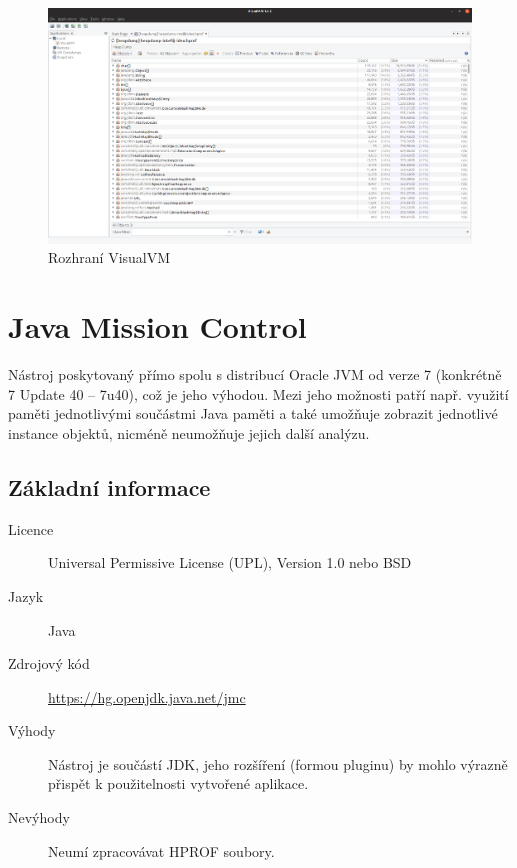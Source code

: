 \begin{figure}[ht!]
	\centering
	\includegraphics[scale=0.3]{obrazky/visualvm.png}
	\caption{Rozhraní VisualVM}
	\label{obr-visualvm}
\end{figure}

\section{Java Mission Control}
Nástroj poskytovaný přímo spolu s distribucí Oracle JVM od verze 7 (konkrétně 7 Update 40 – 7u40), což je jeho výhodou. Mezi jeho možnosti patří např. využití paměti jednotlivými součástmi Java paměti a také umožňuje zobrazit jednotlivé instance objektů, nicméně neumožňuje jejich další analýzu.

\subsection{Základní informace}

\begin{description}
    \item[Licence] Universal Permissive License (UPL), Version 1.0 nebo BSD
    \item[Jazyk] Java
    \item[Zdrojový kód] \url{https://hg.openjdk.java.net/jmc} 
    \item[Výhody] Nástroj je součástí JDK, jeho rozšíření (formou pluginu) by mohlo výrazně přispět k použitelnosti vytvořené aplikace.
    \item[Nevýhody] Neumí zpracovávat HPROF soubory.
\end{description}

